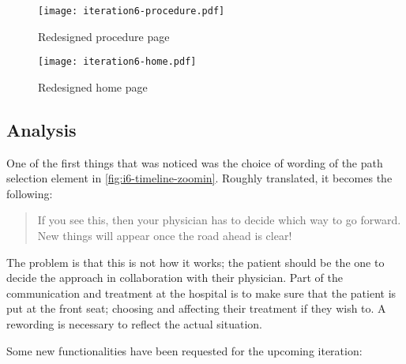 \begin{figure}
    \centering
    \begin{minipage}[t]{0.45\textwidth}
        \centering
        \vspace{0pt}
        \texttt{[image: iteration6-procedure.pdf]}
        \caption{Redesigned procedure page}
        \label{fig:i6-procedure}
    \end{minipage}
    \begin{minipage}[t]{0.45\textwidth}
        \centering
        \vspace{0pt}
        \texttt{[image: iteration6-home.pdf]}
        \caption{Redesigned home page}
        \label{fig:i6-home}
    \end{minipage}
\end{figure}


\subsection{Analysis}

One of the first things that was noticed was the choice of wording of the path selection element in \autoref{fig:i6-timeline-zoomin}. Roughly translated, it becomes the following:

\begin{quote}
    If you see this, then your physician has to decide which way to go forward. New things will appear once the road ahead is clear!
\end{quote}

The problem is that this is not how it works; the patient should be the one to decide the approach in collaboration with their physician. Part of the communication and treatment at the hospital is to make sure that the patient is put at the front seat; choosing and affecting their treatment if they wish to. A rewording is necessary to reflect the actual situation.

Some new functionalities have been requested for the upcoming iteration:

